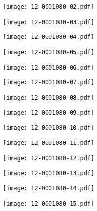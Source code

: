 \documentclass[10pt,twocolumn,letterpaper]{article}
\begin{document}
\begin{figure*}[t]
 \begin{minipage}{0.058\textwidth} \centering \texttt{[image: 12-0001080-02.pdf]} \end{minipage}
 \begin{minipage}{0.058\textwidth} \centering \texttt{[image: 12-0001080-03.pdf]} \end{minipage}
 \begin{minipage}{0.058\textwidth} \centering \texttt{[image: 12-0001080-04.pdf]} \end{minipage}
 \begin{minipage}{0.058\textwidth} \centering \texttt{[image: 12-0001080-05.pdf]} \end{minipage}
 \begin{minipage}{0.058\textwidth} \centering \texttt{[image: 12-0001080-06.pdf]} \end{minipage}
 \begin{minipage}{0.058\textwidth} \centering \texttt{[image: 12-0001080-07.pdf]} \end{minipage}
 \begin{minipage}{0.058\textwidth} \centering \texttt{[image: 12-0001080-08.pdf]} \end{minipage}
 \begin{minipage}{0.058\textwidth} \centering \texttt{[image: 12-0001080-09.pdf]} \end{minipage}
 \begin{minipage}{0.058\textwidth} \centering \texttt{[image: 12-0001080-10.pdf]} \end{minipage}
 \begin{minipage}{0.058\textwidth} \centering \texttt{[image: 12-0001080-11.pdf]} \end{minipage}
 \begin{minipage}{0.058\textwidth} \centering \texttt{[image: 12-0001080-12.pdf]} \end{minipage}
 \begin{minipage}{0.058\textwidth} \centering \texttt{[image: 12-0001080-13.pdf]} \end{minipage}
 \begin{minipage}{0.058\textwidth} \centering \texttt{[image: 12-0001080-14.pdf]} \end{minipage}
 \begin{minipage}{0.058\textwidth} \centering \texttt{[image: 12-0001080-15.pdf]} \end{minipage}

\end{figure*}
\end{document}
